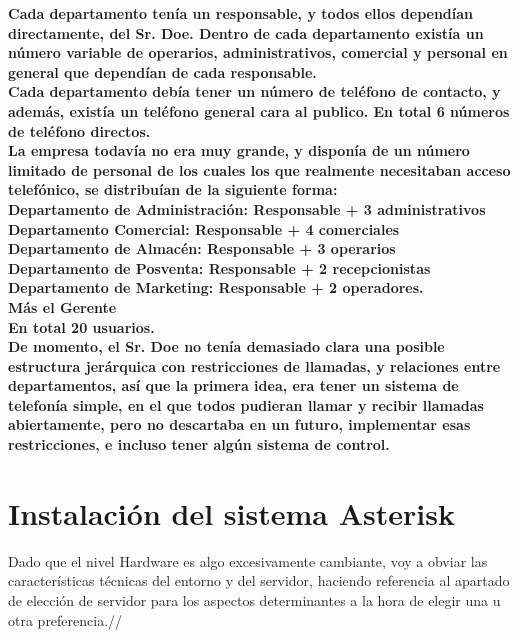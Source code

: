 \textbf{Cada departamento tenía un responsable, y todos ellos dependían directamente, del Sr. Doe. Dentro de cada departamento existía un número variable de operarios, administrativos, comercial y personal en general que dependían de cada responsable.}\\

\textbf{Cada departamento debía tener un número de teléfono de contacto, y además, existía un teléfono general cara al publico. En total 6 números de teléfono directos.}\\

\textbf{La empresa todavía no era muy grande, y disponía de un número limitado de personal de los cuales los que realmente necesitaban acceso telefónico, se distribuían de la siguiente forma:}\\

\textbf{Departamento de Administración: Responsable + 3 administrativos}\\
\textbf{Departamento Comercial: Responsable + 4 comerciales}\\
\textbf{Departamento de Almacén: Responsable + 3 operarios}\\
\textbf{Departamento de Posventa: Responsable + 2 recepcionistas}\\
\textbf{Departamento de Marketing: Responsable + 2 operadores.} \\
\textbf{Más el Gerente}\\

\textbf{En total 20 usuarios.}\\

\textbf{De momento, el Sr. Doe no tenía demasiado clara una posible estructura jerárquica con restricciones de llamadas, y relaciones entre departamentos, así que la primera idea, era tener un sistema de telefonía simple, en el que todos pudieran llamar y recibir llamadas abiertamente, pero no descartaba en un futuro, implementar esas restricciones, e incluso tener algún sistema de control.}

\section{Instalación del sistema Asterisk}

Dado que el nivel Hardware es algo excesivamente cambiante, voy a obviar las características técnicas del entorno y del servidor, haciendo referencia al apartado de elección de servidor para los aspectos determinantes a la hora de elegir una u otra preferencia.//


